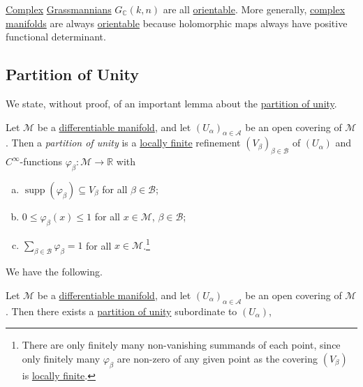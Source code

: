 \begin{remark}
	\hyperref[def:complex-manifold]{Complex} \hyperref[def:Grassmannian-manifold]{Grassmannians} \(G_{\mathbb{C} }(k, n)\) are all \hyperref[def:orientable]{orientable}. More generally, \hyperref[def:complex-manifold]{complex manifolds} are always \hyperref[def:orientable]{orientable} because holomorphic maps always have positive functional determinant.
\end{remark}

\subsection{Partition of Unity}
We state, without proof, of an important lemma about the \hyperref[def:partition-of-unity]{partition of unity}.

\begin{definition}\label{def:partition-of-unity}
	Let \(\mathcal{M} \) be a \hyperref[def:smooth-manifold]{differentiable manifold}, and let \((U_\alpha )_{\alpha \in \mathcal{A} }\) be an open covering of \(\mathcal{M} \). Then a \emph{partition of unity} is a \hyperref[def:locally-finite]{locally finite} refinement \((V_\beta )_{\beta \in \mathcal{B} }\) of \((U_\alpha )\) and \(C^{\infty} \)-functions \(\varphi _\beta \colon \mathcal{M} \to  \mathbb{R} \) with
	\begin{enumerate}[(a)]
		\item \(\mathop{\mathrm{supp}}(\varphi _\beta ) \subseteq V_\beta  \) for all \(\beta \in \mathcal{B} \);
		\item \(0 \leq \varphi _\beta (x) \leq 1\) for all \(x\in \mathcal{M} \), \(\beta \in \mathcal{B} \);
		\item \(\sum_{\beta \in \mathcal{B} } \varphi _\beta = 1 \) for all \(x\in \mathcal{M} \).\footnote{There are only finitely many non-vanishing summands of each point, since only finitely many \(\varphi _\beta \) are non-zero of any given point as the covering \((V_\beta )\) is \hyperref[def:locally-finite]{locally finite}.}
	\end{enumerate}
\end{definition}

We have the following.

\begin{lemma}\label{lma:partition-of-unity}
	Let \(\mathcal{M} \) be a \hyperref[def:smooth-manifold]{differentiable manifold}, and let \((U_\alpha )_{\alpha \in \mathcal{A} }\) be an open covering of \(\mathcal{M} \). Then there exists a \hyperref[def:partition-of-unity]{partition of unity} subordinate to \((U_\alpha )\),
\end{lemma}

